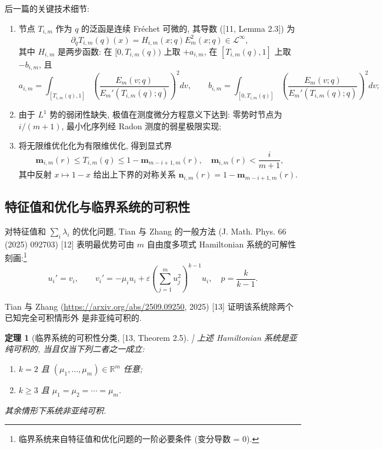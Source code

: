 \documentclass[UTF8]{ctexart}
\newtheorem{theorem}{定理}[section]
\begin{document}
后一篇的关键技术细节:

\begin{enumerate}
	\item 节点 $T_{i,m}$ 作为 $q$ 的泛函是连续 Fr\'echet 可微的, 其导数
		([11, Lemma 2.3]) 为
		\begin{equation}
			\partial_q T_{i,m}(q)(x) = H_{i,m}(x; q) E_m^2(x; q) \in \mathcal{L}^{\infty},
		\end{equation}
		其中 $H_{i,m}$ 是两步函数: 在 $[0, T_{i,m}(q))$ 上取 $+a_{i,m}$, 在
		$[T_{i,m}(q), 1]$ 上取 $-b_{i,m}$, 且
		\begin{equation*}
			a_{i,m} = \int_{[T_{i,m}(q),1]} \left( \frac{E_m(v;q)}{E_m'(T_{i,m}(q);q)} \right)^2 dv, \qquad
			b_{i,m} = \int_{[0,T_{i,m}(q)]} \left( \frac{E_m(v;q)}{E_m'(T_{i,m}(q);q)} \right)^2 dv;
		\end{equation*}
	\item 由于 $L^1$ 势的弱闭性缺失, 极值在测度微分方程意义下达到: 零势时节点为
		$i/(m+1)$, 最小化序列经 Radon 测度的弱星极限实现;
	\item 将无限维优化化为有限维优化, 得到显式界
		\begin{equation}
			\mathbf{m}_{i,m}(r) \leq T_{i,m}(q) \leq 1 - \mathbf{m}_{m-i+1,m}(r),
			\quad \mathbf{m}_{i,m}(r) < \frac{i}{m+1},
		\end{equation}
		其中反射 $x \mapsto 1 - x$ 给出上下界的对称关系
		$\mathbf{n}_{i,m}(r) = 1 - \mathbf{m}_{m-i+1,m}(r)$.
\end{enumerate}

\subsection{特征值和优化与临界系统的可积性}

对特征值和 $\sum_i \lambda_i$ 的优化问题, Tian 与 Zhang 的一般方法 (J. Math. Phys.
66 (2025) 092703) [12] 表明最优势可由 $m$ 自由度多项式 Hamiltonian 系统的可解性
刻画:\footnote{临界系统来自特征值和优化问题的一阶必要条件 (变分导数 = 0).}
\begin{equation}
	u_i' = v_i, \qquad
	v_i' = -\mu_i u_i + \varepsilon \left( \sum_{j=1}^{m} u_j^2 \right)^{k-1} u_i,
	\quad p = \frac{k}{k-1}.
\end{equation}

Tian 与 Zhang (\url{https://arxiv.org/abs/2509.09250}, 2025) [13] 证明该系统除两个已知完全可积情形外
是非亚纯可积的.

\begin{theorem}[临界系统的可积性分类, [13, Theorem 2.5]]
上述 Hamiltonian 系统是亚纯可积的, 当且仅当下列二者之一成立:
\begin{enumerate}
	\item $k = 2$ 且 $(\mu_1, \ldots, \mu_m) \in \mathbb{R}^m$ 任意;
	\item $k \geq 3$ 且 $\mu_1 = \mu_2 = \cdots = \mu_m$.
\end{enumerate}
其余情形下系统非亚纯可积.
\end{theorem}
\end{document}
